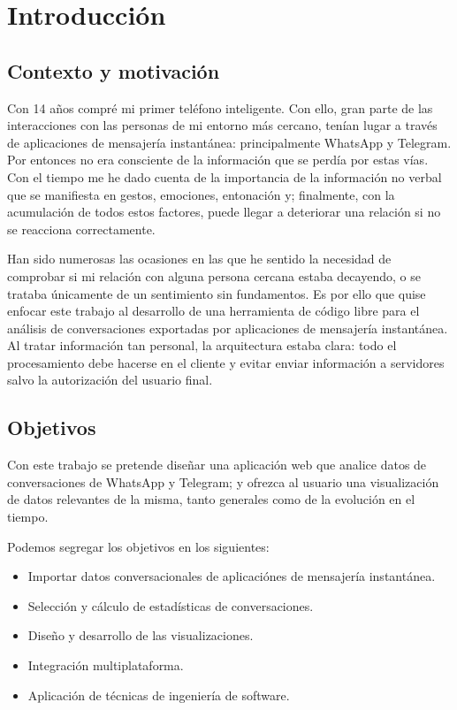 \chapter{Introducción}
\label{chap:introduction}

\section{Contexto y motivación}
\label{sec:context}

Con 14 años compré mi primer teléfono inteligente. Con ello, gran parte de las interacciones con las personas de mi entorno más cercano, tenían lugar a través de aplicaciones de mensajería instantánea: principalmente WhatsApp y Telegram. Por entonces no era consciente de la información que se perdía por estas vías. Con el tiempo me he dado cuenta de la importancia de la información no verbal que se manifiesta en gestos, emociones, entonación y; finalmente, con la acumulación de todos estos factores, puede llegar a deteriorar una relación si no se reacciona correctamente.

Han sido numerosas las ocasiones en las que he sentido la necesidad de comprobar si mi relación con alguna persona cercana estaba decayendo, o se trataba únicamente de un sentimiento sin fundamentos. Es por ello que quise enfocar este trabajo al desarrollo de una herramienta de código libre para el análisis de conversaciones exportadas por aplicaciones de mensajería instantánea. Al tratar información tan personal, la arquitectura estaba clara: todo el procesamiento debe hacerse en el cliente y evitar enviar información a servidores salvo la autorización del usuario final.

\section{Objetivos}
\label{sec:project-goals}


Con este trabajo se pretende diseñar una aplicación web que analice datos de conversaciones de WhatsApp y Telegram; y ofrezca al usuario una visualización de datos relevantes de la misma, tanto generales como de la evolución en el tiempo.

Podemos segregar los objetivos en los siguientes:

\begin{itemize}

\item Importar datos conversacionales de aplicaciónes de mensajería instantánea.
\item Selección y cálculo de estadísticas de conversaciones.
\item Diseño y desarrollo de las visualizaciones.
\item Integración multiplataforma.
\item Aplicación de técnicas de ingeniería de software.

\end{itemize}

